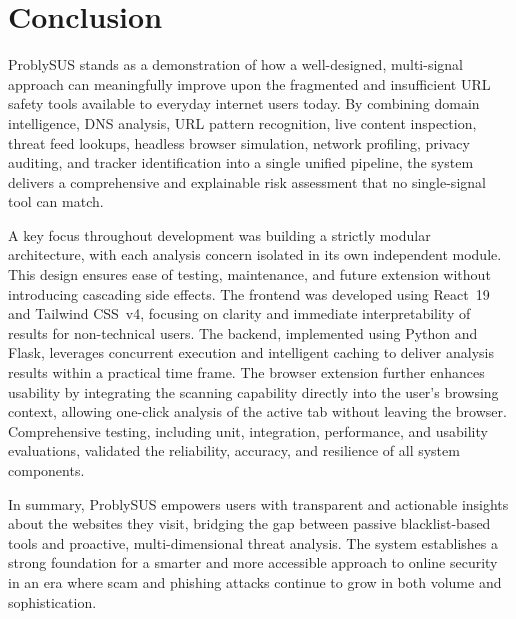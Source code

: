 \chapter*{Conclusion}

ProblySUS stands as a demonstration of how a well-designed, multi-signal approach can meaningfully improve upon the fragmented and insufficient URL safety tools available to everyday internet users today. By combining domain intelligence, DNS analysis, URL pattern recognition, live content inspection, threat feed lookups, headless browser simulation, network profiling, privacy auditing, and tracker identification into a single unified pipeline, the system delivers a comprehensive and explainable risk assessment that no single-signal tool can match.

A key focus throughout development was building a strictly modular architecture, with each analysis concern isolated in its own independent module. This design ensures ease of testing, maintenance, and future extension without introducing cascading side effects. The frontend was developed using React~19 and Tailwind CSS~v4, focusing on clarity and immediate interpretability of results for non-technical users. The backend, implemented using Python and Flask, leverages concurrent execution and intelligent caching to deliver analysis results within a practical time frame. The browser extension further enhances usability by integrating the scanning capability directly into the user’s browsing context, allowing one-click analysis of the active tab without leaving the browser. Comprehensive testing, including unit, integration, performance, and usability evaluations, validated the reliability, accuracy, and resilience of all system components.

In summary, ProblySUS empowers users with transparent and actionable insights about the websites they visit, bridging the gap between passive blacklist-based tools and proactive, multi-dimensional threat analysis. The system establishes a strong foundation for a smarter and more accessible approach to online security in an era where scam and phishing attacks continue to grow in both volume and sophistication.